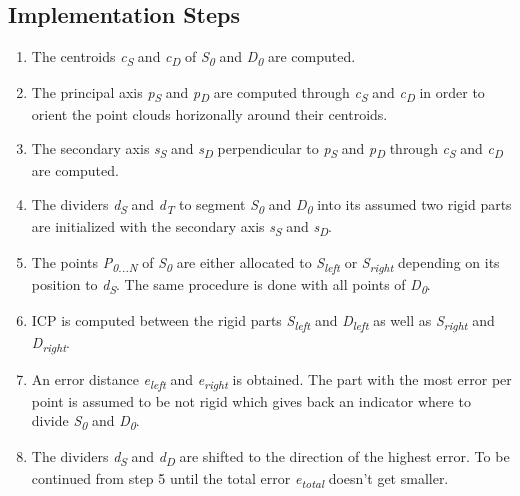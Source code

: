  \subsection{Implementation Steps}
 
 \begin{enumerate}
 	\item The centroids \textit{c\textsubscript{S}} and \textit{c\textsubscript{D}} of \textit{S\textsubscript{0}} and \textit{D\textsubscript{0}} are computed.
 	
 	\item The principal axis \textit{p\textsubscript{S}} and \textit{p\textsubscript{D}}  are computed through \textit{c\textsubscript{S}} and \textit{c\textsubscript{D}} in order to orient the point clouds horizonally around their centroids.
 	
 	\item The secondary axis \textit{s\textsubscript{S}} and \textit{s\textsubscript{D}} perpendicular to \textit{p\textsubscript{S}} and \textit{p\textsubscript{D}} through \textit{c\textsubscript{S}} and \textit{c\textsubscript{D}} are computed.
 	
 	\item The dividers \textit{d\textsubscript{S}} and \textit{d\textsubscript{T}} to segment \textit{S\textsubscript{0}} and \textit{D\textsubscript{0}} into its assumed two rigid parts are initialized with the secondary axis \textit{s\textsubscript{S}} and \textit{s\textsubscript{D}}.
 	
 	\item The points \textit{P\textsubscript{0...N}} of \textit{S\textsubscript{0}}  are either allocated to \textit{S\textsubscript{left}} or \textit{S\textsubscript{right}} depending on its position to \textit{d\textsubscript{S}}. The same procedure is done with all points of \textit{D\textsubscript{0}}.
 	
 	\item ICP is computed between the rigid parts \textit{S\textsubscript{left}} and \textit{D\textsubscript{left}} as well as \textit{S\textsubscript{right}} and \textit{D\textsubscript{right}}.
 	
 	\item An error distance \textit{e\textsubscript{left}} and \textit{e\textsubscript{right}} is obtained. The part with the most error per point is assumed to be not rigid which gives back an indicator where to divide \textit{S\textsubscript{0}} and \textit{D\textsubscript{0}}.
 	
 	\item The dividers \textit{d\textsubscript{S}} and \textit{d\textsubscript{D}} are shifted to the direction of the highest error. To be continued from step 5 until the total error \textit{e\textsubscript{total}} doesn't get smaller.
 \end{enumerate}


